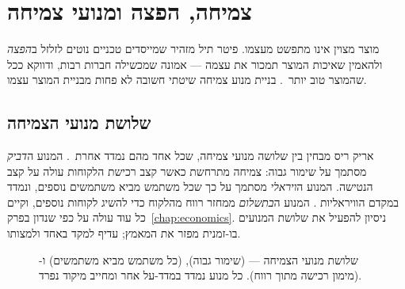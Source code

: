 \chapter{צמיחה, הפצה ומנועי צמיחה}
\label{chap:growth}

מוצר מצוין אינו מתפשט מעצמו. פיטר תיל מזהיר שמייסדים טכניים נוטים לזלזל
ב\emph{הפצה}  ולהאמין שאיכות המוצר תמכור את עצמה — אמונה
שמכשילה חברות רבות, ודווקא ככל שהמוצר טוב יותר~\cite{thiel2014zero}. בניית מנוע
צמיחה שיטתי חשובה לא פחות מבניית המוצר עצמו.

\section{שלושת מנועי הצמיחה}

אריק ריס מבחין בין שלושה מנועי צמיחה, שכל אחד מהם נמדד אחרת~\cite{ries2011lean}.
המנוע ה\emph{דביק}  מסתמך על שימור גבוה: צמיחה מתרחשת כאשר קצב
רכישת הלקוחות עולה על קצב הנטישה. המנוע ה\emph{ויראלי}  מסתמך על
כך שכל משתמש מביא משתמשים נוספים, ונמדד במקדם הוויראליות
. המנוע ה\emph{בתשלום}  ממחזר רווח
מהלקוח כדי להשיג לקוחות נוספים, וקיים כל עוד  עולה על  כפי
שנדון בפרק~\ref{chap:economics}. ניסיון להפעיל את שלושת המנועים בו-זמנית מפזר
את המאמץ; עדיף למקד באחד ולמצותו.

\begin{figure}[htbp]
\centering
\caption{שלושת מנועי הצמיחה —  (שימור גבוה),  (כל משתמש מביא
משתמשים) ו- (מימון רכישה מתוך רווח). כל מנוע נמדד במדד-על אחר ומחייב מיקוד נפרד.}
\label{fig:engines}
\end{figure}

